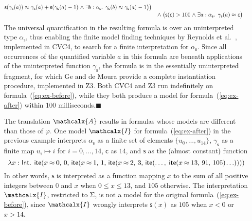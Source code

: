 \documentclass[runningheads,a4paper]{llncs}
\newcommand{\con}[1]{\mathsf{#1}}
\let\const=\con
\let\oldSigma=\Sigma
\def\Sigma{\mathrm{\oldSigma}}
\let\oldwedge=\wedge
\def\wedge{\mathrel{\oldwedge}}
\newcommand\cvc{CVC4\xspace}
\newcommand\ziii{Z3\xspace}
\newcommand{\teq}{\approx}
\newcommand{\I}{\mathcalx{I}}
\newcommand{\conv}{\mathcalx{A}}
\newcommand{\typeint}{\ty{Int}}
\newcommand\ty[1]{\con{#1}}
\newcommand{\lite}{\con{ite}}
\newcommand\concret{\gamma} %
\newcommand{\farg}[1]{\concret_{#1}}
\newcommand{\fargtype}[1]{\alpha_{#1}}
\newcommand{\rem}[1]{\textcolor{red}{[#1]}}
\newcommand{\ct}[1]{\rem{#1 --ct}}
\newcommand{\negvthinspace}{\kern-0.083333em}
\newcommand\xend{{\hfill$\scriptstyle\blacksquare$}}
\begin{document}
\begin{example}
\begin{equation}
\begin{aligned}[c]
\begin{aligned}[t]
\\[-\jot]
  & \con{s}(\farg{\con{s}}( a )) \teq \farg{\con{s}}( a ) + \con{s}( \farg{\con{s}}( a )-1 )
    \wedge \exists b : {\fargtype{\con{s}}}.\;\, \farg{\con{s}}( b ) \teq \farg{\con{s}}( a )-1 \bigr) \bigr)
\end{aligned}
\\[-\jot]
 & {\wedge}\; \bigl( \con{s}( \con{c} ) > 100 \wedge \exists a : {\fargtype{\con{s}}}.\;\, \farg{\con{s}}( a ) \teq \con{c} \bigr)
\end{aligned}
\end{equation}
%
The universal quantification in the resulting formula is over an uninterpreted
type $\fargtype{\con{s}}$, thus enabling the finite model finding
techniques by Reynolds et al.\ \cite{ReyEtAl-1-RR-13,reynolds-et-al-2013},
implemented in \cvc, to search for a finite interpretation for $\fargtype{\con{s}}$. 
Since all occurrences of the quantified variable $a$ in this formula are 
beneath applications of the uninterpreted function $\farg{\con{s}}$, 
the formula is in the essentially uninterpreted fragment,
for which Ge and de Moura \cite{GeDeM-CAV-09} provide 
a complete instantiation procedure, implemented in \ziii. 
Both
\cvc and \ziii run indefinitely on formula~(\ref{eq:ex-before}), 
while they both produce a model for formula~(\ref{eq:ex-after}) 
within 100 milliseconds.\xend
\end{example}

The translation $\conv$ results in formulas whose models are different than those of $\varphi$.
One model $\I$ for formula~(\ref{eq:ex-after}) in the previous example interprets
$\fargtype{\con{s}}$ as a finite set of elements $\{ u_0, \ldots, u_{14} \}$,
$\farg{\con{s}}$ as a finite map $u_i \mapsto i$ for $i = 0, \ldots, 14$,
$\con{c}$ as $14$,
and $\con{s}$ as the (almost constant) function
%
\begin{equation} \label{eq:approx-interp}
\lambda x : \typeint.\;\, \lite( x \mathbin{\teq} 0,\, 0,\,
  \lite( x \mathbin{\teq} 1,\, 1,\,
    \lite( x \mathbin{\teq} 2,\, 3,\,
      \lite(\ldots,\; \lite( x \mathbin{\teq} 13,\, 91,\, 105 )\negvthinspace \ldots ))))
\end{equation}
%
In other words, $\const{s}$ is interpreted as a function mapping $x$ to the sum
of all positive integers between $0$ and $x$ when $0 \leq x \leq 13$, and $105$
otherwise.
The interpretation $\I$, restricted to $\Sigma$, is {not} a model for the original formula~(\ref{eq:ex-before}),
since $\I$ wrongly interprets $\con{s}( x )$ as $105$ when $x < 0$ or $x > 14$.
\end{document}
